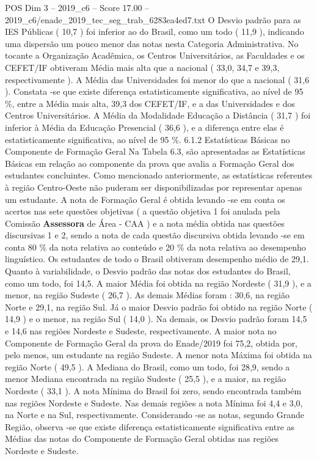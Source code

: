 \begin{textsample}{POS Dim 3 – 2019\_c6 – Score 17.00 – 2019\_c6/enade\_2019\_tec\_seg\_trab\_6283ea4ed7.txt}
O Desvio padrão para as IES Públicas ( 10,7 ) foi inferior ao do Brasil, como um todo ( 11,9 ), indicando uma dispersão um pouco menor das notas nesta Categoria Administrativa.
No tocante a Organização Acadêmica, os Centros Universitários, as Faculdades e os CEFET/IF obtiveram Média mais alta que a nacional ( 33,0, 34,7 e 39,3, respectivamente ).
A Média das Universidades foi menor do que a nacional ( 31,6 ).
Constata -se que existe diferença estatisticamente significativa, ao nível de 95 \%, entre a Média mais alta, 39,3 dos CEFET/IF, e a das Universidades e dos Centros Universitários.
A Média da Modalidade Educação a Distância ( 31,7 ) foi inferior à Média da Educação Presencial ( 36,6 ), e a diferença entre elas é estatisticamente significativa, ao nível de 95 \%. 6.1.2 Estatísticas Básicas no Componente de Formação Geral Na Tabela 6.3, são apresentadas as Estatísticas Básicas em relação ao componente da prova que avalia a Formação Geral dos estudantes concluintes.
Como mencionado anteriormente, as estatísticas referentes à região Centro-Oeste não puderam ser disponibilizadas por representar apenas um estudante.
A nota de Formação Geral é obtida levando -se em conta os acertos nas sete questões objetivas ( a questão objetiva 1 foi anulada pela Comissão \textbf{Assessora} de Área - CAA ) e a nota média obtida nas questões discursivas 1 e 2, sendo a nota de cada questão discursiva obtida levando -se em conta 80 \% da nota relativa ao conteúdo e 20 \% da nota relativa ao desempenho linguístico.
Os estudantes de todo o Brasil obtiveram desempenho médio de 29,1.
Quanto à variabilidade, o Desvio padrão das notas dos estudantes do Brasil, como um todo, foi 14,5.
A maior Média foi obtida na região Nordeste ( 31,9 ), e a menor, na região Sudeste ( 26,7 ).
As demais Médias foram : 30,6, na região Norte e 29,1, na região Sul.
Já o maior Desvio padrão foi obtido na região Norte ( 14,9 ) e o menor, na região Sul ( 14,0 ).
Na demais, os Desvio padrão foram 14,5 e 14,6 nas regiões Nordeste e Sudeste, respectivamente.
A maior nota no Componente de Formação Geral da prova do Enade/2019 foi 75,2, obtida por, pelo menos, um estudante na região Sudeste.
A menor nota Máxima foi obtida na região Norte ( 49,5 ).
A Mediana do Brasil, como um todo, foi 28,9, sendo a menor Mediana encontrada na região Sudeste ( 25,5 ), e a maior, na região Nordeste ( 33,1 ).
A nota Mínima do Brasil foi zero, sendo encontrada também nas regiões Nordeste e Sudeste.
Nas demais regiões a nota Mínima foi 4,4 e 3,0, na Norte e na Sul, respectivamente.
Considerando -se as notas, segundo Grande Região, observa -se que existe diferença estatisticamente significativa entre as Médias das notas do Componente de Formação Geral obtidas nas regiões Nordeste e Sudeste.

\end{textsample}
